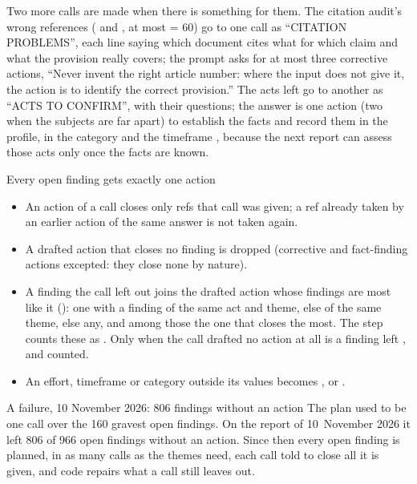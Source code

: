 Two more calls are made when there is something for them. The citation audit's wrong
references ( and , at most  = 60)
go to one call as \enquote{CITATION PROBLEMS}, each line saying which document cites what for
which claim and what the provision really covers; the prompt asks for at most three corrective
actions, \enquote{Never invent the right article number: where the input does not give it, the
action is to identify the correct provision.} The acts left  go to another as
\enquote{ACTS TO CONFIRM}, with their questions; the answer is one action (two when the subjects
are far apart) to establish the facts and record them in the profile, in the category
 and the timeframe , because the next report can assess those
acts only once the facts are known.

\begin{codebox}{Every open finding gets exactly one action}
\begin{itemize}
  \item An action of a call closes only refs that call was given; a ref already taken by an
    earlier action of the same answer is not taken again.
  \item A drafted action that closes no finding is dropped (corrective and fact-finding actions
    excepted: they close none by nature).
  \item A finding the call left out joins the drafted action whose findings are most like it
    (): one with a finding of the same act and theme, else of the same
    theme, else any, and among those the one that closes the most. The step counts these as
    . Only when the call drafted no action at all is a finding left
    , and counted.
  \item An effort, timeframe or category outside its values becomes ,
     or .
\end{itemize}
\end{codebox}

\begin{lessonbox}{A failure, 10 November 2026: 806 findings without an action}
The plan used to be one call over the 160 gravest open findings. On the report of
10~November 2026 it left 806 of 966 open findings without an action. Since then every open
finding is planned, in as many calls as the themes need, each call told to close all it is
given, and code repairs what a call still leaves out.
\end{lessonbox}

